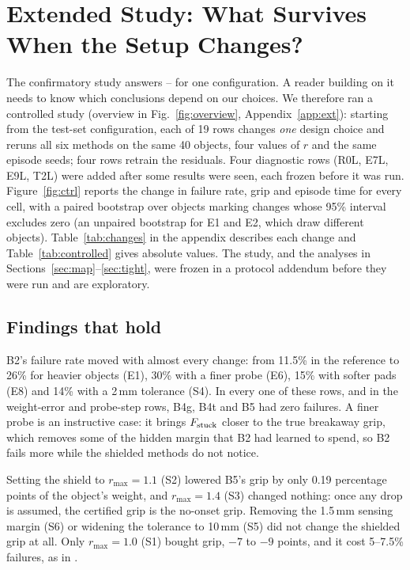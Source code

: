 \section{Extended Study: What Survives When the Setup Changes?}\label{sec:extended}
The confirmatory study answers -- for one configuration. A reader building on it needs to know which conclusions
depend on our choices. We therefore ran a controlled study (overview in Fig.~\ref{fig:overview}, Appendix~\ref{app:ext}): starting from the test-set
configuration, each of 19 rows changes \emph{one} design choice and reruns all six methods on the same 40 objects, four
values of $r$ and the same episode seeds; four rows retrain the residuals. Four diagnostic rows (R0L, E7L, E9L, T2L) were
added after some results were seen, each frozen before it was run. Figure~\ref{fig:ctrl} reports the change in
failure rate, grip and episode time for every cell, with a paired bootstrap over objects marking changes whose 95\%
interval excludes zero (an unpaired bootstrap for E1 and E2, which draw different objects). Table~\ref{tab:changes} in the
appendix describes each change and Table~\ref{tab:controlled} gives absolute values. The study, and the analyses in
Sections~\ref{sec:map}--\ref{sec:tight}, were frozen in a protocol addendum before they were run and are exploratory.





\subsection{Findings that hold}
 B2's failure rate moved with almost every change:
from 11.5\% in the reference to 26\% for heavier objects (E1), 30\% with a finer probe (E6), 15\% with softer pads (E8) and
14\% with a 2\,mm tolerance (S4). In every one of these rows, and in the weight-error and probe-step rows, B4g, B4t and B5
had zero failures. A finer probe is an instructive case: it brings $F_{\mathrm{stuck}}$ closer to the true breakaway grip, which removes
some of the hidden margin that B2 had learned to spend, so B2 fails more while the shielded methods do not notice.

 Setting the shield to $r_{\max}=1.1$ (S2) lowered B5's grip by only 0.19 percentage points of the
object's weight, and $r_{\max}=1.4$ (S3) changed nothing: once any drop is assumed, the certified grip is the no-onset grip.
Removing the 1.5\,mm sensing margin (S6) or widening the tolerance to 10\,mm (S5) did not change the shielded grip at all.
Only $r_{\max}=1.0$ (S1) bought grip, $-7$ to $-9$ points, and it cost 5--7.5\% failures, as in .

